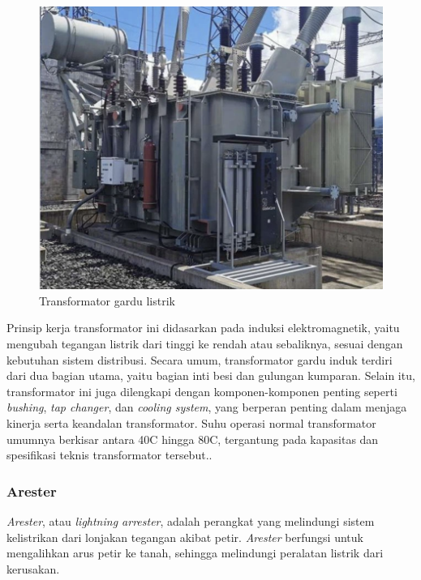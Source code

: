 \begin{figure} [H] \centering
  \includegraphics[scale=0.45]{gambar/trafo.png}
  \caption{Transformator gardu listrik}
  \label{fig:Transformator gardu listrik}
\end{figure}

Prinsip kerja transformator ini didasarkan pada induksi elektromagnetik, yaitu mengubah tegangan listrik dari tinggi ke rendah atau sebaliknya, sesuai dengan kebutuhan sistem distribusi. Secara umum, transformator gardu induk terdiri dari dua bagian utama, yaitu bagian inti besi dan gulungan kumparan. Selain itu, transformator ini juga dilengkapi dengan komponen-komponen penting seperti \emph{bushing}, \emph{tap changer}, dan \emph{cooling system}, yang berperan penting dalam menjaga kinerja serta keandalan transformator. Suhu operasi normal transformator umumnya berkisar antara 40\textdegree{}C hingga 80\textdegree{}C, tergantung pada kapasitas dan spesifikasi teknis transformator tersebut.\cite{tambunan2023kerja}.

\subsubsection{Arester}
\emph{Arester}, atau \emph{lightning arrester}, adalah perangkat yang melindungi sistem kelistrikan dari lonjakan tegangan akibat petir. \emph{Arester} berfungsi untuk mengalihkan arus petir ke tanah, sehingga melindungi peralatan listrik dari kerusakan. 


